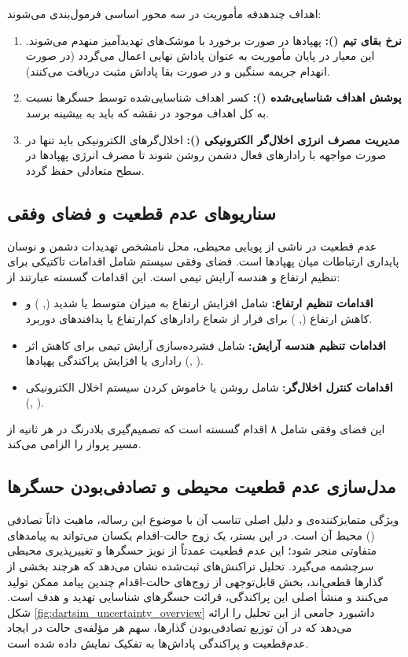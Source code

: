 \documentclass[oneside,openany,phd]{TMU-Thesis}
\begin{document}
اهداف چندهدفه مأموریت در سه محور اساسی فرمول‌بندی می‌شوند:
\begin{enumerate}
    \item \textbf{نرخ بقای تیم ():} پهپادها در صورت برخورد با موشک‌های تهدیدآمیز منهدم می‌شوند. این معیار در پایان مأموریت به عنوان پاداش نهایی اعمال می‌گردد (در صورت انهدام جریمه سنگین و در صورت بقا پاداش مثبت دریافت می‌کنند).
    \item \textbf{پوشش اهداف شناسایی‌شده ():} کسر اهداف شناسایی‌شده توسط حسگرها نسبت به کل اهداف موجود در نقشه که باید به بیشینه برسد.
    \item \textbf{مدیریت مصرف انرژی اخلال‌گر الکترونیکی ():} اخلال‌گرهای الکترونیکی باید تنها در صورت مواجهه با رادارهای فعال دشمن روشن شوند تا مصرف انرژی پهپادها در سطح متعادلی حفظ گردد.
\end{enumerate}

\subsection{سناریوهای عدم قطعیت و فضای وفقی}

عدم قطعیت در  ناشی از پویایی محیطی، محل نامشخص تهدیدات دشمن و نوسان پایداری ارتباطات میان پهپادها است. فضای وفقی سیستم شامل اقدامات تاکتیکی برای تنظیم ارتفاع و هندسه آرایش تیمی است. این اقدامات گسسته عبارتند از:
\begin{itemize}
    \item \textbf{اقدامات تنظیم ارتفاع:} شامل افزایش ارتفاع به میزان متوسط یا شدید (, ) و کاهش ارتفاع (, ) برای فرار از شعاع رادارهای کم‌ارتفاع یا پدافندهای دوربرد.
    \item \textbf{اقدامات تنظیم هندسه آرایش:} شامل فشرده‌سازی آرایش تیمی برای کاهش اثر راداری یا افزایش پراکندگی پهپادها (, ).
    \item \textbf{اقدامات کنترل اخلال‌گر:} شامل روشن یا خاموش کردن سیستم اخلال الکترونیکی (, ).
\end{itemize}
این فضای وفقی شامل ۸ اقدام گسسته است که تصمیم‌گیری بلادرنگ در هر ثانیه از مسیر پرواز را الزامی می‌کند.

\subsection{مدل‌سازی عدم قطعیت محیطی و تصادفی‌بودن حسگرها}
\label{subsec:dartsim_uncertainty}

ویژگی متمایزکننده‌ی  و دلیل اصلی تناسب آن با موضوع این رساله، ماهیت ذاتاً تصادفی () محیط آن است. در این بستر، یک زوج حالت-اقدام یکسان می‌تواند به پیامدهای متفاوتی منجر شود؛ این عدم قطعیت عمدتاً از نویز حسگرها و تغییرپذیری محیطی سرچشمه می‌گیرد. تحلیل تراکنش‌های ثبت‌شده نشان می‌دهد که هرچند بخشی از گذارها قطعی‌اند، بخش قابل‌توجهی از زوج‌های حالت-اقدام چندین پیامد ممکن تولید می‌کنند و منشأ اصلی این پراکندگی، قرائت حسگرهای شناسایی تهدید و هدف است. شکل \ref{fig:dartsim_uncertainty_overview} داشبورد جامعی از این تحلیل را ارائه می‌دهد که در آن توزیع تصادفی‌بودن گذارها، سهم هر مؤلفه‌ی حالت در ایجاد عدم‌قطعیت و پراکندگی پاداش‌ها به تفکیک نمایش داده شده است.
\end{document}
